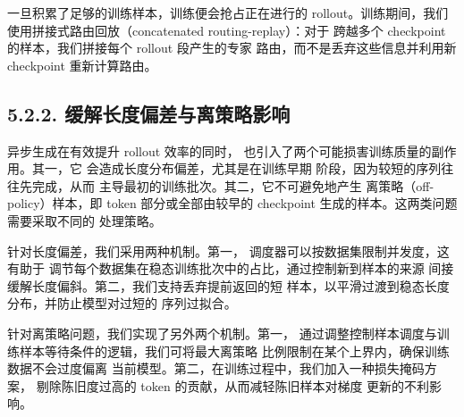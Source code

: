 一旦积累了足够的训练样本，训练便会抢占正在进行的
rollout。训练期间，我们使用拼接式路由回放（concatenated routing-replay）：对于
跨越多个 checkpoint 的样本，我们拼接每个 rollout 段产生的专家
路由，而不是丢弃这些信息并利用新 checkpoint
重新计算路由。



\subsection{5.2.2. 缓解长度偏差与离策略影响}\label{mitigating-length-bias-and-off-policy-effects}

异步生成在有效提升 rollout 效率的同时，
也引入了两个可能损害训练质量的副作用。其一，它
会造成长度分布偏差，尤其是在训练早期
阶段，因为较短的序列往往先完成，从而
主导最初的训练批次。其二，它不可避免地产生
离策略（off-policy）样本，即 token 部分或全部由较早的 checkpoint 生成的样本。这两类问题需要采取不同的
处理策略。

针对长度偏差，我们采用两种机制。第一，
调度器可以按数据集限制并发度，这有助于
调节每个数据集在稳态训练批次中的占比，通过控制新到样本的来源
间接缓解长度偏斜。第二，我们支持丢弃提前返回的短
样本，以平滑过渡到稳态长度
分布，并防止模型对过短的
序列过拟合。

针对离策略问题，我们实现了另外两个机制。第一，
通过调整控制样本调度与训练样本等待条件的逻辑，我们可将最大离策略
比例限制在某个上界内，确保训练数据不会过度偏离
当前模型。第二，在训练过程中，我们加入一种损失掩码方案，
剔除陈旧度过高的 token 的贡献，从而减轻陈旧样本对梯度
更新的不利影响。